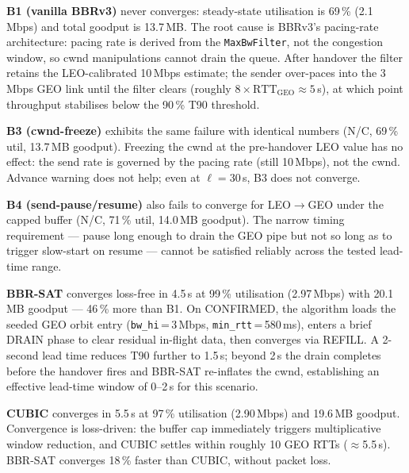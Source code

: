 \documentclass[conference]{IEEEtran}
\begin{document}
\textbf{B1 (vanilla BBRv3)} never converges: steady-state utilisation is
69\,\% (2.1\,Mbps) and total goodput is 13.7\,MB.
The root cause is BBRv3's pacing-rate architecture: pacing rate is derived
from the \texttt{MaxBwFilter}, not the congestion window, so cwnd
manipulations cannot drain the queue.
After handover the filter retains the LEO-calibrated 10\,Mbps estimate;
the sender over-paces into the 3\,Mbps GEO link until the filter clears
(roughly $8 \times \mathrm{RTT}_\mathrm{GEO} \approx 5$\,s), at which
point throughput stabilises below the 90\,\% T90 threshold.

\textbf{B3 (cwnd-freeze)} exhibits the same failure with identical numbers
(N/C, 69\,\% util, 13.7\,MB goodput).
Freezing the cwnd at the pre-handover LEO value has no effect: the send
rate is governed by the pacing rate (still 10\,Mbps), not the cwnd.
Advance warning does not help; even at $\ell = 30$\,s, B3 does not converge.

\textbf{B4 (send-pause/resume)} also fails to converge for LEO$\to$GEO
under the capped buffer (N/C, 71\,\% util, 14.0\,MB goodput).
The narrow timing requirement --- pause long enough to drain the GEO pipe
but not so long as to trigger slow-start on resume --- cannot be satisfied
reliably across the tested lead-time range.

\textbf{BBR-SAT} converges loss-free in 4.5\,s at 99\,\% utilisation
(2.97\,Mbps) with 20.1\,MB goodput --- 46\,\% more than B1.
On CONFIRMED, the algorithm loads the seeded GEO orbit entry
(\texttt{bw\_hi}\,=\,3\,Mbps, \texttt{min\_rtt}\,=\,580\,ms),
enters a brief DRAIN phase to clear residual in-flight data,
then converges via REFILL.
A 2-second lead time reduces T90 further to 1.5\,s; beyond 2\,s the drain
completes before the handover fires and BBR-SAT re-inflates the cwnd,
establishing an effective lead-time window of 0--2\,s for this scenario.

\textbf{CUBIC} converges in 5.5\,s at 97\,\% utilisation (2.90\,Mbps)
and 19.6\,MB goodput.
Convergence is loss-driven: the buffer cap immediately triggers
multiplicative window reduction, and CUBIC settles within roughly
10 GEO RTTs ($\approx$5.5\,s).
BBR-SAT converges 18\,\% faster than CUBIC, without packet loss.
\end{document}

